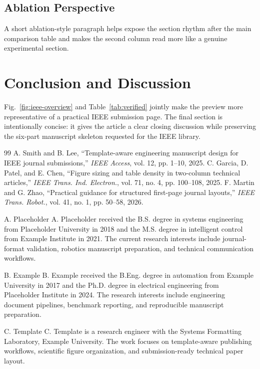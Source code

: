 \documentclass[journal]{IEEEtran}
\begin{document}
\subsection{Ablation Perspective}
A short ablation-style paragraph helps expose the section rhythm after the main comparison table and makes the second column read more like a genuine experimental section.
\section{Conclusion and Discussion}
Fig.~\ref{fig:ieee-overview} and Table~\ref{tab:verified} jointly make the preview more representative of a practical IEEE submission page. The final section is intentionally concise: it gives the article a clear closing discussion while preserving the six-part manuscript skeleton requested for the IEEE library.
\begin{thebibliography}{99}
 A. Smith and B. Lee, ``Template-aware engineering manuscript design for IEEE journal submissions,'' \emph{IEEE Access}, vol. 12, pp. 1--10, 2025.
 C. Garcia, D. Patel, and E. Chen, ``Figure sizing and table density in two-column technical articles,'' \emph{IEEE Trans. Ind. Electron.}, vol. 71, no. 4, pp. 100--108, 2025.
 F. Martin and G. Zhao, ``Practical guidance for structured first-page journal layouts,'' \emph{IEEE Trans. Robot.}, vol. 41, no. 1, pp. 50--58, 2026.
\end{thebibliography}
\begin{IEEEbiography}{A. Placeholder}
A. Placeholder received the B.S. degree in systems engineering from Placeholder University in 2018 and the M.S. degree in intelligent control from Example Institute in 2021. The current research interests include journal-format validation, robotics manuscript preparation, and technical communication workflows.
\end{IEEEbiography}
\begin{IEEEbiography}{B. Example}
B. Example received the B.Eng. degree in automation from Example University in 2017 and the Ph.D. degree in electrical engineering from Placeholder Institute in 2024. The research interests include engineering document pipelines, benchmark reporting, and reproducible manuscript preparation.
\end{IEEEbiography}
\begin{IEEEbiography}{C. Template}
C. Template is a research engineer with the Systems Formatting Laboratory, Example University. The work focuses on template-aware publishing workflows, scientific figure organization, and submission-ready technical paper layout.
\end{IEEEbiography}
\end{document}
